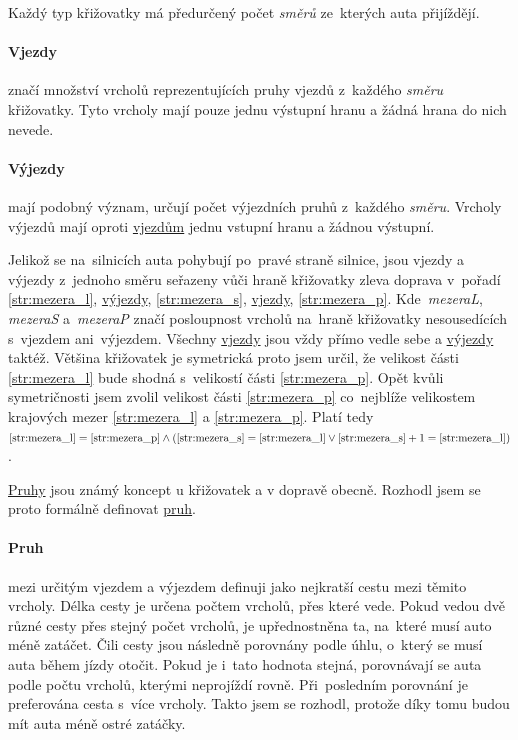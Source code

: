 Každý typ křižovatky má předurčený počet \emph{směrů} ze~kterých auta přijíždějí.

\paragraph{Vjezdy}\label{par:vjezdy} značí množství vrcholů reprezentujících pruhy vjezdů z~každého \emph{směru} křižovatky.
Tyto vrcholy mají pouze jednu výstupní hranu a žádná hrana do nich nevede.

\paragraph{Výjezdy}\label{par:vyjezdy} mají podobný význam, určují počet výjezdních pruhů z~každého \emph{směru}.
Vrcholy výjezdů mají oproti \hyperref[par:vjezdy]{vjezdům} jednu vstupní hranu a žádnou výstupní.

Jelikož se na~silnicích auta pohybují po~pravé straně silnice,
jsou vjezdy a výjezdy z~jednoho směru seřazeny vůči hraně křižovatky zleva doprava v~pořadí
\ref{str:mezera_l}, \hyperref[par:vyjezdy]{výjezdy}, \ref{str:mezera_s}, \hyperref[par:vyjezdy]{vjezdy}, \ref{str:mezera_p}.
Kde~\emph{mezeraL}, \emph{mezeraS}
a~\emph{mezeraP} značí posloupnost vrcholů na~hraně křižovatky
nesousedících s~vjezdem ani~výjezdem.
Všechny \hyperref[par:vjezdy]{vjezdy} jsou vždy přímo vedle sebe a \hyperref[par:vyjezdy]{výjezdy} taktéž.
Většina křižovatek je symetrická proto jsem určil, že velikost části \ref{str:mezera_l} bude shodná s~velikostí části \ref{str:mezera_p}.
Opět kvůli symetričnosti jsem zvolil velikost části \ref{str:mezera_p} co~nejblíže velikostem
krajových mezer \ref{str:mezera_l} a \ref{str:mezera_p}.
Platí tedy $\ref{str:mezera_l}=\ref{str:mezera_p}\wedge(\ref{str:mezera_s}=\ref{str:mezera_l}\vee\ref{str:mezera_s}+1=\ref{str:mezera_l})$.

\hyperref[par:pruh]{Pruhy} jsou známý koncept u křižovatek a v dopravě obecně.
Rozhodl jsem se proto formálně definovat \hyperref[par:pruh]{pruh}.
\paragraph{Pruh}\label{par:pruh} mezi určitým vjezdem a výjezdem definuji jako nejkratší cestu mezi těmito vrcholy.
Délka cesty je určena počtem vrcholů, přes které vede.
Pokud vedou dvě různé cesty přes stejný počet vrcholů, je upřednostněna ta, na~které musí auto méně zatáčet.
Čili cesty jsou následně porovnány podle úhlu, o~který se musí auta během jízdy otočit.
Pokud je i~tato hodnota stejná, porovnávají se auta podle počtu vrcholů, kterými neprojíždí rovně.
Při~posledním porovnání je preferována cesta s~více vrcholy.
Takto jsem se rozhodl, protože díky tomu budou mít auta méně ostré zatáčky.

